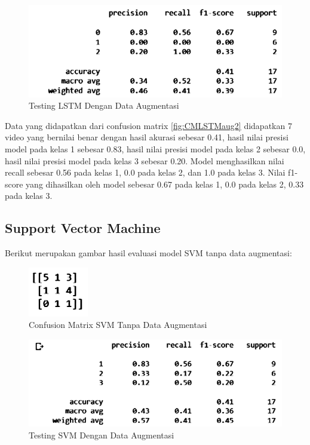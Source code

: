 \begin{figure} [ht] \centering
  \includegraphics[scale=0.55]{gambar/scoreLSTMaug2.png}
  \caption{Testing LSTM Dengan Data Augmentasi}
  \label{fig:ScoreLSTMaug2}
\end{figure}
Data yang didapatkan dari confusion matrix \ref{fig:CMLSTMaug2} didapatkan 7 video yang bernilai benar
dengan hasil akurasi sebesar 0.41, hasil nilai presisi model pada kelas 1 sebesar 0.83, hasil nilai
presisi model pada kelas 2 sebesar 0.0, hasil nilai presisi model pada kelas 3 sebesar 0.20. Model menghasilkan
nilai recall sebesar 0.56 pada kelas 1, 0.0 pada kelas 2, dan 1.0 pada kelas 3. Nilai f1-score yang dihasilkan
oleh model sebesar 0.67 pada kelas 1, 0.0 pada kelas 2, 0.33 pada kelas 3.

\subsection{Support Vector Machine}
Berikut merupakan gambar hasil evaluasi model SVM tanpa data augmentasi:

\newpage
\begin{figure} [ht] \centering
  \includegraphics[scale=2.5]{gambar/CMSVMnoAug2.png}
  \caption{Confusion Matrix SVM Tanpa Data Augmentasi}
  \label{fig:CMSVMnoaug2}
\end{figure}

\begin{figure} [ht] \centering
  \includegraphics[scale=0.55]{gambar/scoreSVMnoaug2.png}
  \caption{Testing SVM Dengan Data Augmentasi}
  \label{fig:ScoreSVMnoaug2}
\end{figure}

